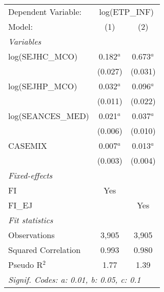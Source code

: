 
\begingroup
\centering
\begin{tabular}{lcc}
   \tabularnewline \midrule \midrule
   Dependent Variable: & \multicolumn{2}{c}{log(ETP\_INF)}\\
   Model:              & (1)         & (2)\\  
   \midrule
   \emph{Variables}\\
   log(SEJHC\_MCO)     & 0.182$^{a}$ & 0.673$^{a}$\\   
                       & (0.027)     & (0.031)\\   
   log(SEJHP\_MCO)     & 0.032$^{a}$ & 0.096$^{a}$\\   
                       & (0.011)     & (0.022)\\   
   log(SEANCES\_MED)   & 0.021$^{a}$ & 0.037$^{a}$\\   
                       & (0.006)     & (0.010)\\   
   CASEMIX             & 0.007$^{a}$ & 0.013$^{a}$\\   
                       & (0.003)     & (0.004)\\   
   \midrule
   \emph{Fixed-effects}\\
   FI                  & Yes         & \\  
   FI\_EJ              &             & Yes\\  
   \midrule
   \emph{Fit statistics}\\
   Observations        & 3,905       & 3,905\\  
   Squared Correlation & 0.993       & 0.980\\  
   Pseudo R$^2$        & 1.77        & 1.39\\  
   \midrule \midrule
   \multicolumn{3}{l}{\emph{Signif. Codes: a: 0.01, b: 0.05, c: 0.1}}\\
\end{tabular}
\par\endgroup


